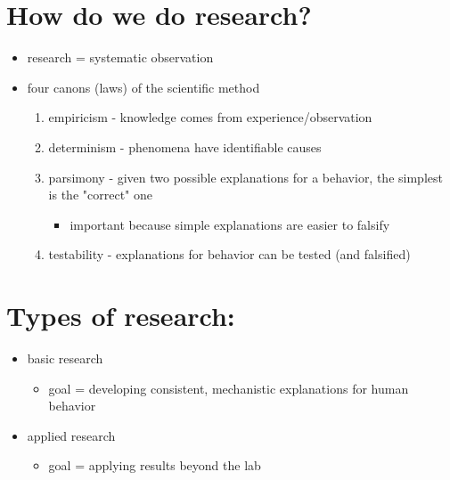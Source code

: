 \documentclass[11pt]{article}
\begin{document}
\section*{How do we do research?}
\label{sec-4}
\begin{itemize}
\item research = systematic observation
\item four canons (laws) of the scientific method
\begin{enumerate}
\item empiricism - knowledge comes from experience/observation
\item determinism - phenomena have identifiable causes
\item parsimony - given two possible explanations for a behavior, the simplest is the "correct" one
\begin{itemize}
\item important because simple explanations are easier to falsify
\end{itemize}
\item testability - explanations for behavior can be tested (and falsified)
\end{enumerate}
\end{itemize}

\section*{Types of research:}
\label{sec-5}
\begin{itemize}
\item basic research
\begin{itemize}
\item goal = developing consistent, mechanistic explanations for human behavior
\end{itemize}
\item applied research
\begin{itemize}
\item goal = applying results beyond the lab
\end{itemize}
\end{itemize}
\end{document}

